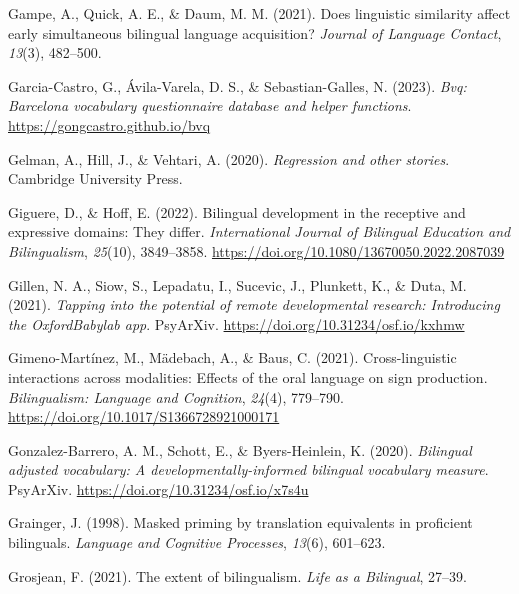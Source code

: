 \documentclass[
]{article}
\newlength{\cslhangindent}
\newlength{\cslentryspacingunit} %
\newenvironment{CSLReferences}[2] %
 {%
  \setlength{\parindent}{0pt}
  \ifodd #1
  \let\oldpar\par
  \def\par{\hangindent=\cslhangindent\oldpar}
  \fi
  \setlength{\parskip}{#2\cslentryspacingunit}
 }%
 {}
\begin{document}
\begin{CSLReferences}{1}{0}
\leavevmode{}%
Gampe, A., Quick, A. E., \& Daum, M. M. (2021). Does linguistic
similarity affect early simultaneous bilingual language acquisition?
\emph{Journal of Language Contact}, \emph{13}(3), 482--500.

\leavevmode{}%
Garcia-Castro, G., Ávila-Varela, D. S., \& Sebastian-Galles, N. (2023).
\emph{Bvq: Barcelona vocabulary questionnaire database and helper
functions}. \url{https://gongcastro.github.io/bvq}

\leavevmode{}%
Gelman, A., Hill, J., \& Vehtari, A. (2020). \emph{Regression and other
stories}. Cambridge University Press.

\leavevmode{}%
Giguere, D., \& Hoff, E. (2022). Bilingual development in the receptive
and expressive domains: They differ. \emph{International Journal of
Bilingual Education and Bilingualism}, \emph{25}(10), 3849--3858.
\url{https://doi.org/10.1080/13670050.2022.2087039}

\leavevmode{}%
Gillen, N. A., Siow, S., Lepadatu, I., Sucevic, J., Plunkett, K., \&
Duta, M. (2021). \emph{Tapping into the potential of remote
developmental research: Introducing the {OxfordBabylab} app}.
{PsyArXiv}. \url{https://doi.org/10.31234/osf.io/kxhmw}

\leavevmode{}%
Gimeno-Martínez, M., Mädebach, A., \& Baus, C. (2021). Cross-linguistic
interactions across modalities: Effects of the oral language on sign
production. \emph{Bilingualism: Language and Cognition}, \emph{24}(4),
779--790. \url{https://doi.org/10.1017/S1366728921000171}

\leavevmode{}%
Gonzalez-Barrero, A. M., Schott, E., \& Byers-Heinlein, K. (2020).
\emph{Bilingual adjusted vocabulary: A developmentally-informed
bilingual vocabulary measure}. {PsyArXiv}.
\url{https://doi.org/10.31234/osf.io/x7s4u}

\leavevmode{}%
Grainger, J. (1998). Masked priming by translation equivalents in
proficient bilinguals. \emph{Language and Cognitive Processes},
\emph{13}(6), 601--623.

\leavevmode{}%
Grosjean, F. (2021). The extent of bilingualism. \emph{Life as a
Bilingual}, 27--39.


\end{CSLReferences}
\end{document}
